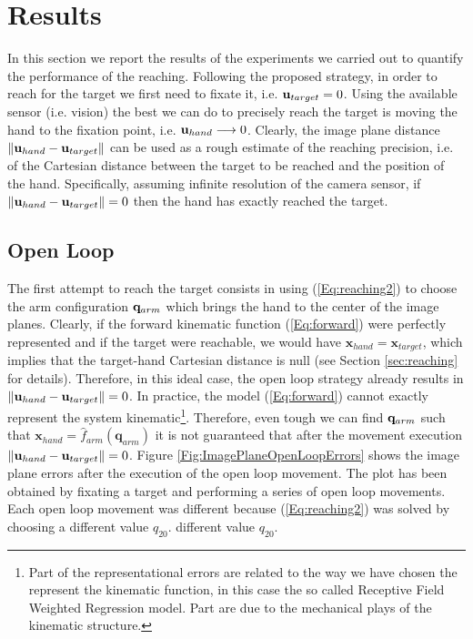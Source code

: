 \section{Results}
\label{sec:results}

In this section we report the results of the experiments we carried out
to quantify the performance of the reaching. Following the proposed strategy, 
in order to reach for the 
target we first need to fixate it, i.e. $\mathbf{u}_{target} = 0$. Using the available sensor (i.e. vision) the best we can do to precisely reach the target is moving the hand to the fixation point, i.e. $
{\mathbf{u}_{hand}} \longrightarrow 0$. Clearly, the image plane distance $\| \mathbf{u}_{hand} - \mathbf{u}_{target} \|$ can be used as a rough estimate of the reaching precision, i.e. of the Cartesian distance between the target to be reached and the position of the hand. Specifically, assuming infinite resolution of the camera sensor, if $\| \mathbf{u}_{hand} - \mathbf{u}_{target}\| = 0$ then the hand has exactly reached the target.

\subsection{Open Loop}
The first attempt to reach the target consists in using (\ref{Eq:reaching2})
to choose the arm configuration $\mathbf q_{arm}$ which brings the hand to the center 
of the image planes. Clearly, if the forward 
kinematic function (\ref{Eq:forward}) were perfectly represented and if the target were reachable, we would have $\mathbf x_{hand} =  \mathbf x_{target}$, which implies that the target-hand Cartesian distance 
 is null (see Section \ref{sec:reaching} for details). Therefore, in this ideal case, the open loop 
 strategy already results in $\| \mathbf{u}_{hand} - \mathbf{u}_{target} \| = 0$. In practice, the model 
 (\ref{Eq:forward}) cannot exactly represent the system kinematic\footnote{Part of the representational 
 errors are related to the way we have chosen the represent the kinematic function, in this case the
 so called Receptive Field Weighted Regression model. Part are due to the mechanical plays of the
 kinematic structure.}. Therefore, even tough we can find $\mathbf q_{arm}$ such that $\mathbf x_{hand}=
 \hat f_{arm}(\mathbf q_{arm})$ it is not guaranteed that after the movement execution 
 $\| \mathbf{u}_{hand} - \mathbf{u}_{target} \| = 0$. Figure \ref{Fig:ImagePlaneOpenLoopErrors}
 shows the image plane errors after the execution of the open loop movement. The plot has been obtained
 by fixating a target and performing a series of open loop movements. Each open loop
 movement was different because (\ref{Eq:reaching2}) was solved 
 by choosing a different value $q_{20}$. different value $q_{20}$. 


